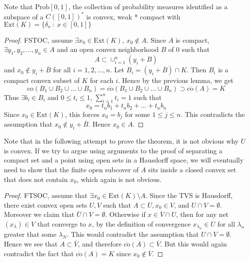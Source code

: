 Note that $\textrm{Prob}[0, 1]$, the collection of probability
measures identified as a subspace of a $C([0, 1])^*$ is convex, weak
* compact with $\textrm{Ext}(K) = \{ \delta_x  \ : \  x \in [0, 1] \}$
\begin{proof}
  FSTOC, assume $\exists x_0 \in \textrm{Ext}(K)$, $x_0 \not \in A$.
  Since $A$ is compact, $\exists y_1 , y_2 , \ldots , y_n \in A$ and
  an open convex neighborhood $B$ of $0$ such that $$A \subset
  \cup_{i = 1}^{n}(y_i + B)$$
  and $x_0 \not\in y_i + \overline{B}$ for all $i = 1, 2, \ldots, n$.
  Let $B_i = (y_i + \overline{B}) \cap K$. Then $B_i$ is a compact
  convex subset of $K$ for each $i$. Hence by the previous lemma, we get \[
    \textrm{co}(B_1 \cup B_2 \cup \ldots \cup B_n) =
    \overline{\textrm{co}}(B_1 \cup B_2 \cup \ldots \cup B_n) \supset
    \overline{\textrm{co}}(A) = K
  \]
  Thus $\exists b_i \in B_i$ and $0 \le t_i \le 1$, $\sum_{i = 1}^{n}
  t_i = 1$ such that
  \marginnote{\scriptsize \textcolor{ red}{I struggle at finding the
  contradiction}}
  \[
    x_0 = t_n b_1 + t_n b_2 + \ldots + t_n b_n
  \]
  Since $x_0 \in \textrm{Ext}(K)$, this forces $x_0 = b_j$ for some
  $1 \le j \le n$.
  This contradicts the assumption that $x_0 \not\in y_i +
  \overline{B}$. Hence $x_0 \in A$.
\end{proof}

Note that in the following attempt to prove the theorem, it is not
obvious why $U$ is convex. If we try to argue using arguments to the
proof of separating a compact set and a point using open sets in a
Hausdorff space, we will eventually need to show that the finite
open subcover of $A$ sits inside a closed convex set that does not
contain $x_0$, which again is not obvious.
\begin{proof}
  FTSOC, assume that $\exists x_0 \in \textrm{Ext}(K)\setminus A$.
  \marginnote{ \scriptsize \textcolor{red}{Why is $U$ convex?}}
  Since the TVS is Hausdorff, there exist convex open sets $U,
  V$ such that $A \subset U, x_0 \in V$, and $U \cap V = \emptyset$.
  Moreover we claim that $\overline{U} \cap V = \emptyset$. Otherwise if $x \in
  \overline{V} \cap U$, then for any net $(x_\lambda) \in V$ that
  converge to $x$, by the definition of convergence $x_{\lambda_n}
  \in U$ for all $\lambda_n$ greater that some $\lambda_N$. This
  would contradict the assumption that $U\cap V = \emptyset$. Hence
  we see that $A \subset \overline{V}$, and therefore
  $\overline{\textrm{co}}(A) \subset \overline{V}$. But this would
  again contradict the fact that $\overline{\textrm{co}}(A) = K$
  since $x_0 \notin \overline{V}$.
\end{proof}


